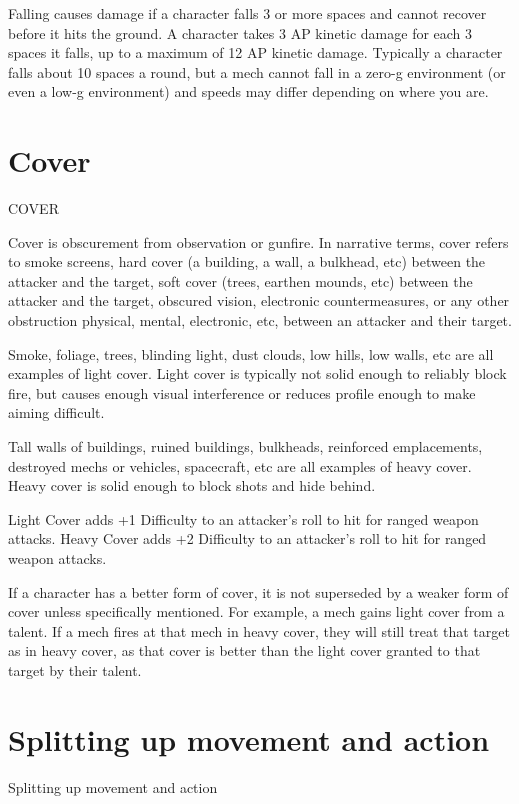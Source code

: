 Falling causes damage if a character falls 3 or more spaces and cannot recover before it hits the
ground. A character takes 3 AP kinetic damage for each 3 spaces it falls, up to a maximum of 12
AP kinetic damage. Typically a character falls about 10 spaces a round, but a mech cannot fall in
a zero-g environment (or even a low-g environment) and speeds may differ depending on where
you are.

\section{Cover}
                                                     COVER

Cover is obscurement from observation or gunfire. In narrative terms, cover refers to smoke
screens, hard cover (a building, a wall, a bulkhead, etc) between the attacker and the target, soft
cover (trees, earthen mounds, etc) between the attacker and the target, obscured vision,
electronic countermeasures, or any other obstruction physical, mental, electronic, etc, between an
attacker and their target.




Smoke, foliage, trees, blinding light, dust clouds, low hills, low walls, etc are all examples of light
cover. Light cover is typically not solid enough to reliably block fire, but causes enough visual
interference or reduces profile enough to make aiming difficult.

Tall walls of buildings, ruined buildings, bulkheads, reinforced emplacements, destroyed mechs
or vehicles, spacecraft, etc are all examples of heavy cover. Heavy cover is solid enough to
block shots and hide behind.

Light Cover adds +1 Difficulty to an attacker’s roll to hit for ranged weapon attacks.
Heavy Cover adds +2 Difficulty to an attacker’s roll to hit for ranged weapon attacks.

If a character has a better form of cover, it is not superseded by a weaker form of cover unless
specifically mentioned. For example, a mech gains light cover from a talent. If a mech fires at that
mech in heavy cover, they will still treat that target as in heavy cover, as that cover is better than
the light cover granted to that target by their talent.

\section{Splitting up movement and action}
                              Splitting up movement and action

